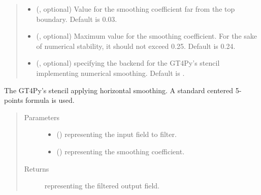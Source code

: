 \documentclass[letterpaper,10pt,english]{sphinxmanual}
\begin{document}
\begin{fulllineitems}
\begin{fulllineitems}
\begin{quote}
\begin{description}
\begin{itemize}
\item {} 
 (, optional) \textendash{} Value for the smoothing coefficient far from the top boundary. Default is 0.03.

\item {} 
 (, optional) \textendash{} Maximum value for the smoothing coefficient. For the sake of numerical stability, it should not
exceed 0.25. Default is 0.24.

\item {} 
 (, optional) \textendash{}  specifying the backend for the GT4Py’s stencil implementing numerical
smoothing. Default is .

\end{itemize}

\end{description}\end{quote}

\end{fulllineitems}


\begin{fulllineitems}
\label{\detokenize{api:dycore.horizontal_smoothing.HorizontalSmoothingSecondOrderXYZ._stencil_defs}}
The GT4Py’s stencil applying horizontal smoothing. A standard centered 5-points formula is used.
\begin{quote}\begin{description}
\item[{Parameters}] \leavevmode\begin{itemize}
\item {} 
 () \textendash{}  representing the input field to filter.

\item {} 
 () \textendash{}  representing the smoothing coefficient.

\end{itemize}

\item[{Returns}] \leavevmode
{} representing the filtered output field.


\end{description}
\end{quote}
\end{fulllineitems}
\end{fulllineitems}
\end{document}
